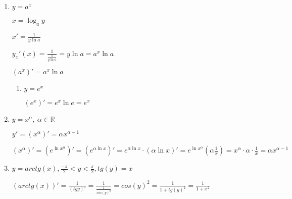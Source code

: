 \documentclass{article}
\begin{document}
    \begin{enumerate}
        \item \( y = a^x \)
        
        \( x = \log_a y \)

        \( x' = \frac{1}{y\ln a} \)

        \( y_x'(x) = \frac{1}{\frac{1}{y\ln a}} = y\ln a = a^x\ln a\)

        \( (a^x)' = a^x\ln a \)

        \begin{enumerate}
            \item \( y = e^x \)
            
            \( (e^x)' = e^x\ln e = e^x \)
        \end{enumerate}

        \item \( y = x^\alpha,\ \alpha \in \mathbb{R} \)
        
        \( y' = (x^\alpha)' = \alpha x^{\alpha - 1} \)

        \( (x^\alpha)' = (e^{\ln x^\alpha})' = (e^{\alpha\ln x})' = e^{\alpha\ln x} \cdot (\alpha\ln x)' = e^{\ln x^\alpha}(\alpha\frac{1}{x}) = x^\alpha \cdot \alpha \cdot \frac{1}{x} = \alpha x^{\alpha - 1} \)

        \item \( y = arctg(x), \frac{-\pi}{2} < y < \frac{\pi}{2}, tg(y) = x \)
        
        \( (arctg(x))' = \frac{1}{(tg y)'} = \frac{1}{\frac{1}{cos(y)^2}} = cos(y)^2 = \frac{1}{1 + tg(y)^2} = \frac{1}{1 + x^2} \)
        
    \end{enumerate}
    \newpage
\end{document}
